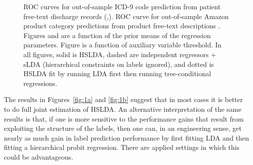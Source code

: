 \begin{figure}[h]
\begin{center}
\caption{ROC curves for out-of-sample ICD-9 code prediction from patient free-text discharge records 
(,). ROC curve for out-of-sample Amazon product category predictions from 
product free-text descriptions . Figures  and  are a function 
of the prior means of the regression parameters. Figure  is a function of auxiliary variable threshold. In all figures, solid is 
HSLDA, dashed are independent regressors + sLDA (hierarchical 
constraints on labels ignored), and dotted is HSLDA fit by running LDA first then running 
tree-conditional regressions.}
\label{fig:main_results}
\end{center}
\end{figure}


The results in Figures~\ref{fig:1a} and \ref{fig:1b} suggest that in most cases
it is better to do full joint estimation of HSLDA.  An alternative
interpretation of the same results is that, if one is more sensitive to the
performance gains that result from exploiting the structure of the labels, then
one can, in an engineering sense, get nearly as much gain in label prediction
performance by first fitting LDA and then fitting a hierarchical probit
regression.  There are applied settings in which this could be advantageous.
